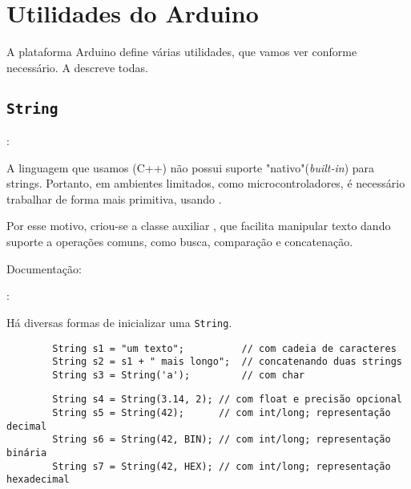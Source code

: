
\section{Utilidades do Arduino}


\begin{frame}{\insertsection}

	A plataforma Arduino define várias utilidades, que vamos ver conforme necessário. A  descreve todas.

\end{frame}


\subsection{\texttt{String}}


\begin{frame}[b]{\insertsection: \insertsubsection}

	A linguagem que usamos (C++) não possui suporte "nativo"\@ (\textit{built-in}) para strings. Portanto, em ambientes limitados, como microcontroladores, é necessário trabalhar de forma mais primitiva, usando .

	\medskip
	Por esse motivo, criou-se a classe auxiliar , que facilita manipular texto dando suporte a operações comuns, como busca, comparação e concatenação.

	\vfill
	Documentação: 

\end{frame}


\begin{frame}[fragile]{\insertsection: \insertsubsection}

	Há diversas formas de inicializar uma \texttt{String}.

	\begin{verbatim}
		String s1 = "um texto";          // com cadeia de caracteres
		String s2 = s1 + " mais longo";  // concatenando duas strings
		String s3 = String('a');         // com char
	\end{verbatim}

	\begin{verbatim}
		String s4 = String(3.14, 2); // com float e precisão opcional
		String s5 = String(42);      // com int/long; representação decimal
		String s6 = String(42, BIN); // com int/long; representação binária
		String s7 = String(42, HEX); // com int/long; representação hexadecimal
	\end{verbatim}

\end{frame}


